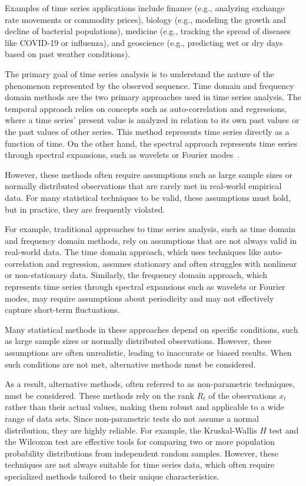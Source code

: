 Examples of time series applications include finance (e.g., analyzing exchange rate movements or commodity prices), biology (e.g., modeling the growth and decline of bacterial populations), medicine (e.g., tracking the spread of diseases like COVID-19 or influenza), and geoscience (e.g., predicting wet or dry days based on past weather conditions).

The primary goal of time series analysis is to understand the nature of the phenomenon represented by the observed sequence. Time domain and frequency domain methods are the two primary approaches used in time series analysis. The temporal approach relies on concepts such as auto-correlation and regressions, where a time series' present value is analyzed in relation to its own past values or the past values of other series. This method represents time series directly as a function of time. On the other hand, the spectral approach represents time series through spectral expansions, such as wavelets or Fourier modes~\cite{treitel1995spectral}.

 
However, these methods often require assumptions such as large sample sizes or normally distributed observations that are rarely met in real-world empirical data. For many statistical techniques to be valid, these assumptions must hold, but in practice, they are frequently violated.

For example, traditional approaches to time series analysis, such as time domain and frequency domain methods, rely on assumptions that are not always valid in real-world data. The time domain approach, which uses techniques like auto-correlation and regression, assumes stationary and often struggles with nonlinear or non-stationary data. Similarly, the frequency domain approach, which represents time series through spectral expansions such as wavelets or Fourier modes, may require assumptions about periodicity and may not effectively capture short-term fluctuations.

Many statistical methods in these approaches depend on specific conditions, such as large sample sizes or normally distributed observations. However, these assumptions are often unrealistic, leading to inaccurate or biased results. When such conditions are not met, alternative methods must be considered.

As a result, alternative methods, often referred to as non-parametric techniques, must be considered. 
These methods rely on the rank $R_t$ of the observations $x_t$ rather than their actual values, making them robust and applicable to a wide range of data sets. Since non-parametric tests do not assume a normal distribution, they are highly reliable. For example, the Kruskal-Wallis $H$ test and the Wilcoxon test are effective tools for comparing two or more population probability distributions from independent random samples. However, these techniques are not always suitable for time series data, which often require specialized methods tailored to their unique characteristics.

